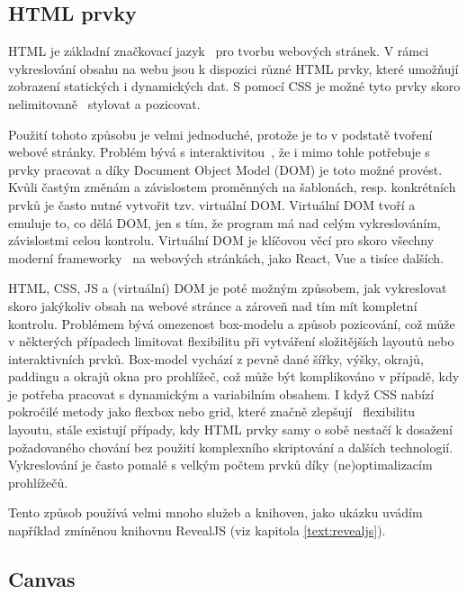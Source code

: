 \subsection{HTML prvky}\label{text:vykreslovani/html}

HTML je základní značkovací jazyk~\cite{uzayr2022frontend} pro tvorbu webových stránek. 
V rámci vykreslování obsahu na webu jsou k dispozici různé HTML prvky, které umožňují zobrazení statických i dynamických dat.
S pomocí CSS je možné tyto prvky skoro nelimitovaně~\cite{uzayr2022frontend} stylovat a pozicovat.

Použití tohoto způsobu je velmi jednoduché, protože je to v podstatě tvoření webové stránky.
Problém bývá s interaktivitou~\cite{uzayr2022frontend}, že i mimo tohle potřebuje s prvky pracovat a díky Document Object Model (DOM) je toto možné provést.
Kvůli častým změnám a závislostem proměnných na šablonách, resp. konkrétních prvků je často nutné vytvořit tzv. virtuální DOM.
Virtuální DOM tvoří a emuluje to, co dělá DOM, jen s tím, že program má nad celým vykreslováním, závislostmi celou kontrolu.
Virtuální DOM je klíčovou věcí pro skoro všechny moderní frameworky~\cite{uzayr2022frontend} na webových stránkách, jako React, Vue a tisíce dalších.

HTML, CSS, JS a (virtuální) DOM je poté možným způsobem, jak vykreslovat skoro jakýkoliv obsah na webové stránce a zároveň nad tím mít kompletní kontrolu.
Problémem bývá omezenost box-modelu a způsob pozicování, což může v některých případech limitovat flexibilitu při vytváření složitějších layoutů nebo interaktivních prvků. Box-model vychází z pevně dané šířky, výšky, okrajů, paddingu a okrajů okna pro prohlížeč, což může být komplikováno v případě, kdy je potřeba pracovat s dynamickým a variabilním obsahem. 
I když CSS nabízí pokročilé metody jako flexbox nebo grid, které značně zlepšují~\cite{uzayr2022frontend} flexibilitu layoutu, stále existují případy, kdy HTML prvky samy o sobě nestačí k dosažení požadovaného chování bez použití komplexního skriptování a dalších technologií.
Vykreslování je často pomalé s velkým počtem prvků díky (ne)optimalizacím prohlížečů.

Tento způsob používá velmi mnoho služeb a knihoven, jako ukázku uvádím například zmíněnou knihovnu RevealJS (viz kapitola \ref{text:revealjs}).

\subsection{Canvas}

